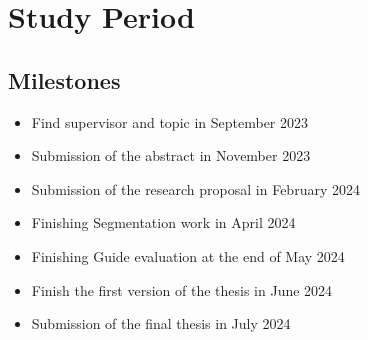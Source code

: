 \rmfamily
\clearpage
\section{Study Period}
\sffamily
\rmfamily

\subsection{Milestones}
\sffamily
\begin{itemize}
  \item[\ding{110}] Find supervisor and topic in September 2023
  \item[\ding{110}] Submission of the abstract in November 2023
  \item[\ding{110}] Submission of the research proposal in February 2024
  \item[\ding{110}] Finishing Segmentation work in April 2024
  \item[\ding{110}] Finishing Guide evaluation at the end of May 2024
  \item[\ding{110}] Finish the first version of the thesis in June 2024
  \item[\ding{110}] Submission of the final thesis in July 2024
\end{itemize}
\rmfamily

